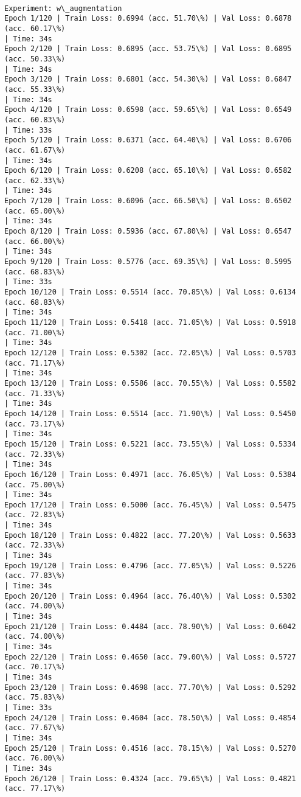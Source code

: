 \documentclass[8pt]{extarticle}
\begin{document}
    \begin{Verbatim}[commandchars=\\\{\}]

Experiment: w\_augmentation
Epoch 1/120 | Train Loss: 0.6994 (acc. 51.70\%) | Val Loss: 0.6878 (acc. 60.17\%)
| Time: 34s
Epoch 2/120 | Train Loss: 0.6895 (acc. 53.75\%) | Val Loss: 0.6895 (acc. 50.33\%)
| Time: 34s
Epoch 3/120 | Train Loss: 0.6801 (acc. 54.30\%) | Val Loss: 0.6847 (acc. 55.33\%)
| Time: 34s
Epoch 4/120 | Train Loss: 0.6598 (acc. 59.65\%) | Val Loss: 0.6549 (acc. 60.83\%)
| Time: 33s
Epoch 5/120 | Train Loss: 0.6371 (acc. 64.40\%) | Val Loss: 0.6706 (acc. 61.67\%)
| Time: 34s
Epoch 6/120 | Train Loss: 0.6208 (acc. 65.10\%) | Val Loss: 0.6582 (acc. 62.33\%)
| Time: 34s
Epoch 7/120 | Train Loss: 0.6096 (acc. 66.50\%) | Val Loss: 0.6502 (acc. 65.00\%)
| Time: 34s
Epoch 8/120 | Train Loss: 0.5936 (acc. 67.80\%) | Val Loss: 0.6547 (acc. 66.00\%)
| Time: 34s
Epoch 9/120 | Train Loss: 0.5776 (acc. 69.35\%) | Val Loss: 0.5995 (acc. 68.83\%)
| Time: 33s
Epoch 10/120 | Train Loss: 0.5514 (acc. 70.85\%) | Val Loss: 0.6134 (acc. 68.83\%)
| Time: 34s
Epoch 11/120 | Train Loss: 0.5418 (acc. 71.05\%) | Val Loss: 0.5918 (acc. 71.00\%)
| Time: 34s
Epoch 12/120 | Train Loss: 0.5302 (acc. 72.05\%) | Val Loss: 0.5703 (acc. 71.17\%)
| Time: 34s
Epoch 13/120 | Train Loss: 0.5586 (acc. 70.55\%) | Val Loss: 0.5582 (acc. 71.33\%)
| Time: 34s
Epoch 14/120 | Train Loss: 0.5514 (acc. 71.90\%) | Val Loss: 0.5450 (acc. 73.17\%)
| Time: 34s
Epoch 15/120 | Train Loss: 0.5221 (acc. 73.55\%) | Val Loss: 0.5334 (acc. 72.33\%)
| Time: 34s
Epoch 16/120 | Train Loss: 0.4971 (acc. 76.05\%) | Val Loss: 0.5384 (acc. 75.00\%)
| Time: 34s
Epoch 17/120 | Train Loss: 0.5000 (acc. 76.45\%) | Val Loss: 0.5475 (acc. 72.83\%)
| Time: 34s
Epoch 18/120 | Train Loss: 0.4822 (acc. 77.20\%) | Val Loss: 0.5633 (acc. 72.33\%)
| Time: 34s
Epoch 19/120 | Train Loss: 0.4796 (acc. 77.05\%) | Val Loss: 0.5226 (acc. 77.83\%)
| Time: 34s
Epoch 20/120 | Train Loss: 0.4964 (acc. 76.40\%) | Val Loss: 0.5302 (acc. 74.00\%)
| Time: 34s
Epoch 21/120 | Train Loss: 0.4484 (acc. 78.90\%) | Val Loss: 0.6042 (acc. 74.00\%)
| Time: 34s
Epoch 22/120 | Train Loss: 0.4650 (acc. 79.00\%) | Val Loss: 0.5727 (acc. 70.17\%)
| Time: 34s
Epoch 23/120 | Train Loss: 0.4698 (acc. 77.70\%) | Val Loss: 0.5292 (acc. 75.83\%)
| Time: 33s
Epoch 24/120 | Train Loss: 0.4604 (acc. 78.50\%) | Val Loss: 0.4854 (acc. 77.67\%)
| Time: 34s
Epoch 25/120 | Train Loss: 0.4516 (acc. 78.15\%) | Val Loss: 0.5270 (acc. 76.00\%)
| Time: 34s
Epoch 26/120 | Train Loss: 0.4324 (acc. 79.65\%) | Val Loss: 0.4821 (acc. 77.17\%)

\end{Verbatim}
\end{document}
